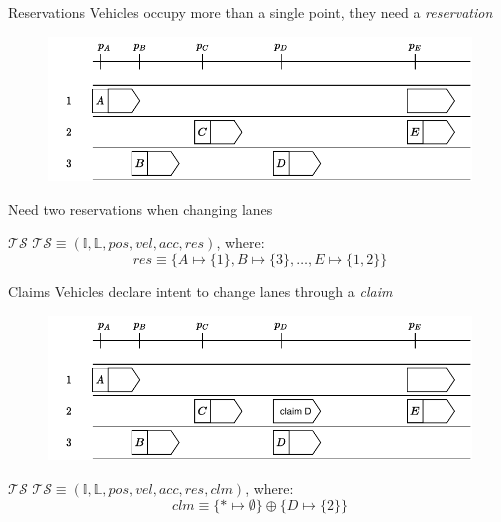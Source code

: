 \documentclass[xcolor=table]{beamer}
\begin{document}
\begin{frame}{Reservations}
Vehicles occupy more than a single point, they need a \textit{reservation}
\pause
\begin{figure}[h]
	\centering
	\includegraphics[width=0.7 \textwidth]{../figs/MLSL_reservation}
\end{figure}

Need two reservations when changing lanes
\pause
\begin{block}{$\mathcal{TS}$}
	$\mathcal{TS} \equiv (\mathbb{I}, \mathbb{L}, pos, vel, acc, res)$, where:
	\begin{equation*}
	res \equiv \{A\mapsto \{1\}, B \mapsto{\{3\}}, \ldots, E \mapsto \{1, 2\}\}
	\end{equation*}
\end{block}

\end{frame}

\begin{frame}{Claims}
Vehicles declare intent to change lanes through a \textit{claim}
\pause
\begin{figure}[h]
	\centering
	\includegraphics[width=0.7 \textwidth]{../figs/MLSL_claim}
\end{figure}
\pause
\begin{block}{$\mathcal{TS}$}
	$\mathcal{TS} \equiv (\mathbb{I}, \mathbb{L}, pos, vel, acc, res, clm)$, where:
	\begin{equation*}
	clm \equiv \{ * \mapsto \emptyset \} \oplus \{D \mapsto \{2\}\}
	\end{equation*}
\end{block}
\end{frame}
\end{document}

